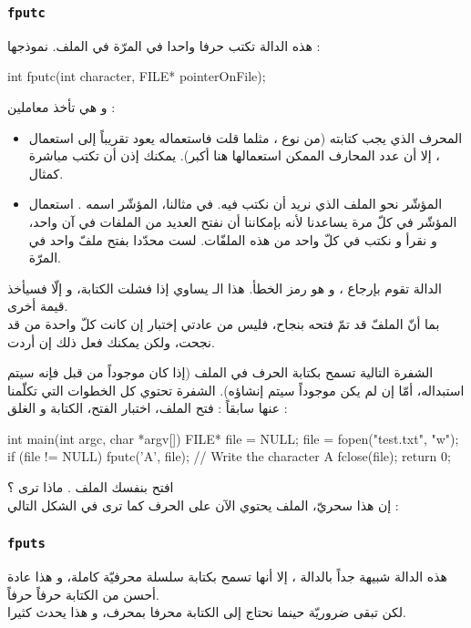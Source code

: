 \subsubsection{\texttt{fputc}}
هذه الدالة تكتب حرفا واحدا في المرّة في الملف. نموذجها :

\begin{Csource}
int fputc(int character, FILE* pointerOnFile);
\end{Csource}

و هي تأخذ معاملين :
\begin{itemize}
  \item المحرف الذي يجب كتابته (من نوع
،
مثلما قلت فاستعماله يعود تقريباً إلى استعمال
،
إلا أن عدد المحارف الممكن استعمالها هنا أكبر). يمكنك إذن أن تكتب مباشرة
كمثال.
  \item المؤشّر نحو الملف الذي نريد أن نكتب فيه. في مثالنا، المؤشّر اسمه
.
استعمال المؤشّر في كلّ مرة يساعدنا لأنه بإمكاننا أن نفتح العديد من الملفات في آن واحد، و نقرأ و نكتب في كلّ واحد من هذه الملفّات. لست محدّدا بفتح ملفّ واحد في المرّة.
\end{itemize}

الدالة تقوم بإرجاع
،
و هو رمز الخطأ. هذا الـ
يساوي
إذا فشلت الكتابة، و إلّا فسيأخذ قيمة أخرى.\\
بما أنّ الملفّ قد تمّ فتحه بنجاح، فليس من عادتي إختبار إن كانت كلّ واحدة من
قد نجحت، ولكن يمكنك فعل ذلك إن أردت.

الشفرة التالية تسمح بكتابة الحرف
في الملف
(إذا كان موجوداً من قبل فإنه سيتم استبداله، أمّا إن لم يكن موجوداً سيتم إنشاؤه). الشفرة تحتوي كل الخطوات التي تكلّمنا عنها سابقاً : فتح الملف، اختبار الفتح، الكتابة و الغلق :

\begin{Csource}
int main(int argc, char *argv[])
{
    FILE* file = NULL;
    file = fopen("test.txt", "w");
    if (file != NULL)
    {
        fputc('A', file); // Write the character A
        fclose(file);
    }
    return 0;
}
\end{Csource}

افتح بنفسك الملف
.
ماذا ترى ؟\\
إن هذا سحريّ، الملف يحتوي الآن على الحرف
كما ترى في الشكل التالي :


\subsubsection{\texttt{fputs}}
هذه الدالة شبيهة جداً بالدالة
،
إلا أنها تسمح بكتابة سلسلة محرفيّة كاملة، و هذا عادة أحسن من الكتابة حرفاً حرفاً.\\
لكن
تبقى ضروريّة حينما نحتاج إلى الكتابة محرفا بمحرف، و هذا يحدث كثيرا.

